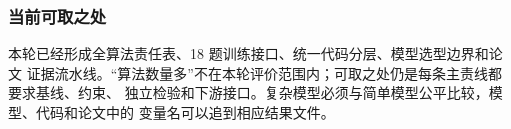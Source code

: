 \subsubsection{当前可取之处}

本轮已经形成全算法责任表、18 题训练接口、统一代码分层、模型选型边界和论文
证据流水线。“算法数量多”不在本轮评价范围内；可取之处仍是每条主责线都要求基线、约束、
独立检验和下游接口。复杂模型必须与简单模型公平比较，模型、代码和论文中的
变量名可以追到相应结果文件。

